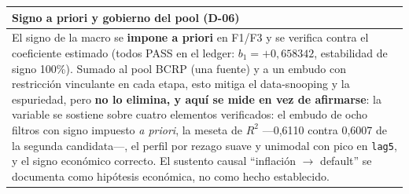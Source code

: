 \documentclass[12pt, a4paper]{article}
\newenvironment{recuadro}[1]
{\begin{center}\begin{tabular}{|p{0.92\textwidth}|}
\hline
\rowcolor{grissuave}
\textbf{#1} \\ \hline
}
{\\ \hline \end{tabular}\end{center}}
\begin{document}
\begin{recuadro}{Signo a priori y gobierno del pool (D-06)}
El signo de la macro se \textbf{impone a priori} en F1/F3 y se verifica contra el coeficiente
estimado (todos PASS en el ledger: $b_1=+0{,}658342$, estabilidad de signo 100\%). Sumado al pool
BCRP (una fuente) y a un embudo con restricción vinculante en cada etapa, esto mitiga el
data-snooping y la espuriedad, pero \textbf{no lo elimina, y aquí se mide en vez de afirmarse}:
la variable se sostiene sobre cuatro elementos verificados: el embudo de ocho filtros con signo
impuesto \emph{a priori}, la meseta de $R^2$ ---0,6110 contra 0,6007 de la segunda candidata---,
el perfil por rezago suave y unimodal con pico en \texttt{lag5}, y el signo económico correcto. El sustento causal ``inflación $\to$ default'' se documenta
como hipótesis económica, no como hecho establecido.
\end{recuadro}
\end{document}
